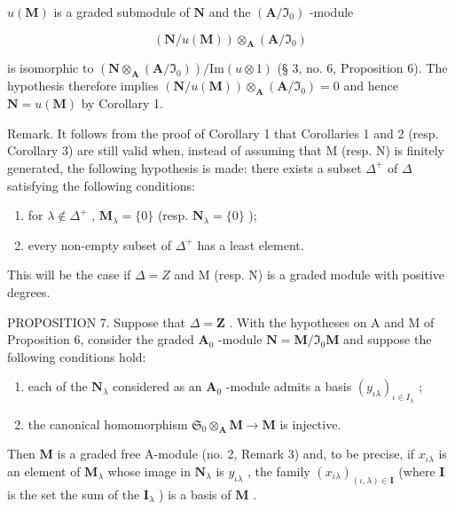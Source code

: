 \(u(\mathbf{M})\) is a graded submodule of \(\mathbf{N}\) and the \((\mathbf{A} / \mathfrak{I}_0)\) -module

\[
(\mathbf {N} / u (\mathbf {M})) \otimes_ {\mathbf {A}} (\mathbf {A} / \mathfrak {I} _ {0})
\]

is isomorphic to \((\mathbf{N} \otimes_{\mathbf{A}} (\mathbf{A} / \mathfrak{I}_0)) / \mathrm{Im}(u \otimes 1)\) (§ 3, no. 6, Proposition 6). The hypothesis therefore implies \((\mathbf{N} / u(\mathbf{M})) \otimes_{\mathbf{A}} (\mathbf{A} / \mathfrak{I}_0) = 0\) and hence \(\mathbf{N} = u(\mathbf{M})\) by Corollary 1.

Remark. It follows from the proof of Corollary 1 that Corollaries 1 and 2 (resp. Corollary 3) are still valid when, instead of assuming that M (resp. N) is finitely generated, the following hypothesis is made: there exists a subset \(\Delta^{+}\) of \(\Delta\) satisfying the following conditions:

\begin{enumerate}
\def\labelenumi{(\arabic{enumi})}
\item
  for \(\lambda \notin \Delta^{+}\) , \(\mathbf{M}_{\lambda} = \{0\}\) (resp. \(\mathbf{N}_{\lambda} = \{0\}\) );
\item
  every non-empty subset of \(\Delta^{+}\) has a least element.
\end{enumerate}

This will be the case if \(\Delta = Z\) and M (resp. N) is a graded module with positive degrees.

PROPOSITION 7. Suppose that \(\Delta = \mathbf{Z}\) . With the hypotheses on A and M of Proposition 6, consider the graded \(\mathbf{A}_0\) -module \(\mathbf{N} = \mathbf{M} / \Im_0\mathbf{M}\) and suppose the following conditions hold:

\begin{enumerate}
\def\labelenumi{(\roman{enumi})}
\item
  each of the \(\mathbf{N}_{\lambda}\) considered as an \(\mathbf{A}_0\) -module admits a basis \((y_{\iota \lambda})_{\iota \in I_{\lambda}}\) ;
\item
  the canonical homomorphism \(\mathfrak{S}_0\otimes_{\mathbf{A}}\mathbf{M}\to \mathbf{M}\) is injective.
\end{enumerate}

Then \(\mathbf{M}\) is a graded free A-module (no. 2, Remark 3) and, to be precise, if \(x_{\iota \lambda}\) is an element of \(\mathbf{M}_{\lambda}\) whose image in \(\mathbf{N}_{\lambda}\) is \(y_{\iota \lambda}\) , the family \((x_{\iota \lambda})_{(\iota ,\lambda)\in \mathbf{I}}\) (where \(\mathbf{I}\) is the set the sum of the \(\mathbf{I}_{\lambda}\) ) is a basis of \(\mathbf{M}\) .

